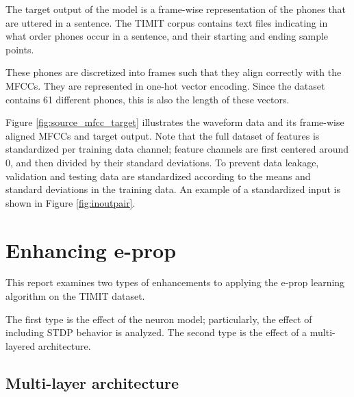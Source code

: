 			The target output of the model is a frame-wise representation of the phones that are uttered in a sentence.
			The TIMIT corpus contains text files indicating in what order phones occur in a sentence, and their starting and ending sample points.

			These phones are discretized into frames such that they align correctly with the MFCCs.
			They are represented in one-hot vector encoding.
			Since the dataset contains 61 different phones, this is also the length of these vectors.

			Figure \ref{fig:source_mfcc_target} illustrates the waveform data and its frame-wise aligned MFCCs and target output.
			Note that the full dataset of features is standardized per training data channel; feature channels are first centered around 0, and then divided by their standard deviations.
			To prevent data leakage, validation and testing data are standardized according to the means and standard deviations in the training data.
			An example of a standardized input is shown in Figure \ref{fig:inoutpair}.

\section{Enhancing e-prop}

	This report examines two types of enhancements to applying the e-prop learning algorithm on the TIMIT dataset.

	The first type is the effect of the neuron model; particularly, the effect of including STDP behavior is analyzed.
	The second type is the effect of a multi-layered architecture.

	\subsection{Multi-layer architecture}\label{sec:ml_arch}

